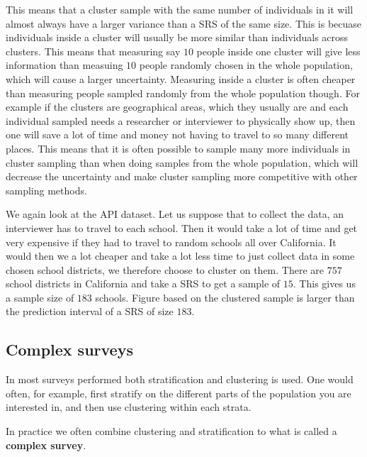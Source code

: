 \documentclass{article}
\begin{document}
This means that a cluster sample with the same number of individuals in it will
almost always have a larger variance than a SRS of the same size. This is
becuase individuals inside a cluster will usually be more similar than
individuals across clusters. This means that measuring say \(10\) people inside
one cluster will give less information than measuing \(10\) people randomly
chosen in the whole population, which will cause a larger uncertainty. Measuring
inside a cluster is often cheaper than measuring people sampled randomly from
the whole population though. For example if the clusters are geographical areas,
which they usually are and each individual sampled needs a researcher or
interviewer to physically show up, then one will save a lot of time and money
not having to travel to so many different places. This means that it is often possible to sample
many more individuals in cluster sampling than when doing samples from the whole
population, which will decrease the uncertainty and make cluster sampling more
competitive with other sampling methods.

\begin{example}
  We again look at the API dataset. Let us suppose that to collect the data, an
  interviewer has to travel to each school. Then it would take a lot of time and
  get very expensive if they had to travel to random schools all over
  California. It would then we a lot cheaper and take a lot less time to just
  collect data in some chosen school districts, we therefore choose to cluster
  on them. There are \(757\) school districts in California and take a SRS to
  get a sample of \(15\). This gives us a sample size of \(183\) schools. Figure
  based on the clustered sample is larger than the prediction interval of a SRS
  of size \(183\).

\end{example}

\subsection{Complex surveys}

In most surveys performed both stratification and clustering is used. One would
often, for example, first stratify on the different parts of the population you
are interested in, and then use clustering within each strata.

In practice we often combine clustering and stratification to what is called a
\textbf{complex survey}. 
\end{document}
